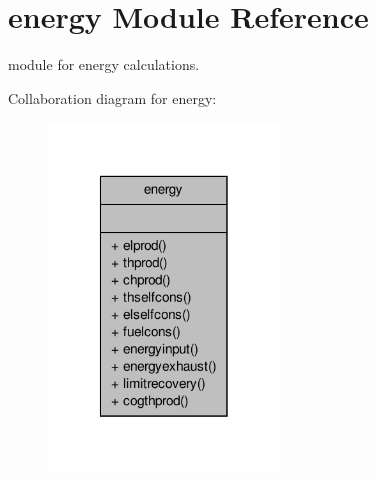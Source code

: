 \hypertarget{classenergy}{\section{energy Module Reference}
\label{classenergy}
}


module for energy calculations.  




Collaboration diagram for energy\-:\nopagebreak
\begin{figure}[H]
\begin{center}
\leavevmode
\includegraphics[width=174pt]{classenergy__coll__graph}
\end{center}
\end{figure}
